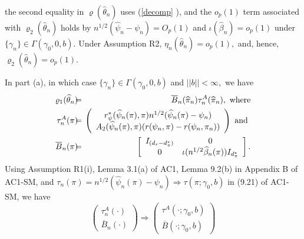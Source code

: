 \documentclass[12pt,titlepage,final,oneside,letterpaper]{article}
\begin{document}
the second equality in $\varrho (\widehat{\theta }_{n})$ uses (\ref{decomp}%
), and the $o_{p}\left( 1\right) $ term associated with $\varrho _{2}(%
\widehat{\theta }_{n})$ holds by $n^{1/2}(\widehat{\psi }_{n}-\psi
_{n})=O_{p}(1)$ and $\iota (\widehat{\beta }_{n})=o_{p}(1)$ under $\{\gamma
_{n}\}\in \Gamma (\gamma _{0},0,b).$ Under Assumption R2, $\eta _{n}(%
\widehat{\theta }_{n})=o_{p}\left( 1\right) ,$ and, hence, $\varrho _{2}(%
\widehat{\theta }_{n})=o_{p}\left( 1\right) .$

In part (a), in which case $\{\gamma _{n}\}\in \Gamma (\gamma _{0},0,b)$ and 
$||b||<\infty ,$ we have%
\begin{eqnarray}
\varrho _{1}(\widehat{\theta }_{n})\hspace{-0.08in} &=&\hspace{-0.08in}%
\overline{B}_{n}(\widehat{\pi }_{n})\tau _{n}^{A}(\widehat{\pi }_{n}),\text{
where}  \notag \\
\tau _{n}^{A}(\pi )\hspace{-0.08in} &=&\hspace{-0.08in}\left( 
\begin{array}{c}
r_{\psi }^{\ast }(\widehat{\psi }_{n}(\pi ),\pi )n^{1/2}(\widehat{\psi }%
_{n}(\pi )-\psi _{n}) \\ 
A_{2}(\widehat{\psi }_{n}(\pi ),\pi )(r(\psi _{n},\pi )-r(\psi _{n},\pi
_{n}))%
\end{array}%
\right) \text{ and }  \notag \\
\overline{B}_{n}(\pi )\hspace{-0.08in} &=&\hspace{-0.08in}\left[ 
\begin{array}{cc}
I_{(d_{r}-d_{\pi }^{\ast })} & 0 \\ 
0 & \iota (n^{1/2}\widehat{\beta }_{n}(\pi ))I_{d_{\pi }^{\ast }}%
\end{array}%
\right] .  \label{Varrho 1}
\end{eqnarray}%
Using Assumption R1(i), Lemma 3.1(a) of AC1, Lemma 9.2(b) in Appendix B of
AC1-SM, and $\tau _{n}(\pi )=n^{1/2}(\widehat{\psi }_{n}(\pi )-\psi
_{n})\Rightarrow \tau (\pi ;\gamma _{0},b)$ in (9.21) of AC1-SM, we have%
\begin{equation}
\left( 
\begin{array}{c}
\tau _{n}^{A}(\cdot ) \\ 
\overline{B}_{n}(\cdot )%
\end{array}%
\right) \Rightarrow \left( 
\begin{array}{c}
\tau ^{A}(\cdot ;\gamma _{0},b) \\ 
\overline{B}(\cdot ;\gamma _{0},b)%
\end{array}%
\right)  \label{tao_A and B_bar}
\end{equation}%
\end{document}
